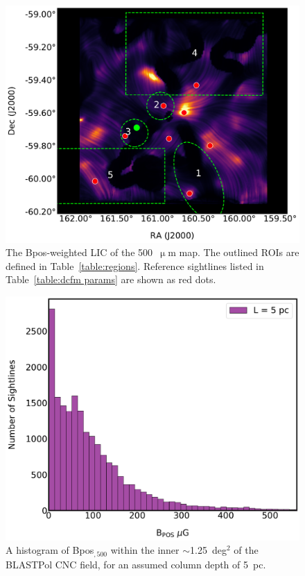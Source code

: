 \begin{figure}[!htbp]
\centering
\includegraphics[width=\textwidth]{figures/carina/B_lic_500_5p0pc}
\caption[The  weighted LIC of the  map.]{The \gls{Bpos}-weighted LIC of the 500~$\upmu$m map. The outlined ROIs are defined in Table~\ref{table:regions}. Reference sightlines listed in Table~\ref{table:dcfm params} are shown as red dots.}
\label{fig:Bpos_LIC}
\end{figure}

\begin{figure}[!htbp]
\centering
\includegraphics[width=\textwidth]{figures/carina/B_hist_500}
\caption[A histogram of  over the inner regions of the CNC.]{A histogram of \gls{Bpos}$_{,500}$ within the inner $\sim$1.25~deg$^{2}$ of the BLASTPol CNC field, for an assumed column depth of 5~pc.}
\label{fig:Bpos_hist}
\end{figure}


